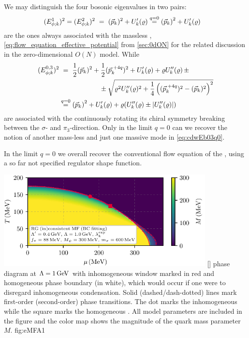 We may distinguish the four bosonic eigenvalues in two pairs:
\begin{align}
	(E_{\phi;k}^{1})^2=(E_{\phi;k}^{2})^2&\stackrel{\phantom{q=0}}{=}(\vec{p}_k)^2+U_k'(\MFrho)\stackrel{q=0}{=}\del{\vec{p}_k}^2+U_k'(\MFrho)\label{eq:cdwEb12}
\end{align}
are the ones always associated with the massless \pionModes{}, \cf{} \cref{eq:flow_equation_effective_potential} from \cref{sec:0dON} for the related discussion in the zero-dimensional $O(N)$ model. 
While
\begin{subequations}\label{eq:cdwEb03}
\begin{align}
	(E_{\phi;k}^{0,3})^2&\stackrel{\phantom{q=0}}{=}\frac{1}{2}(\vec{p}_k)^2 +\frac{1}{2}(\vec{p}_k^{\mkern 5mu+4q})^2+U_k'(\MFrho) +\MFrho U_k''(\MFrho)\, \pm \notag\\
	&\qquad\qquad\qquad\pm \sqrt{\MFrho^2 U_k''(\MFrho)^2+\frac{1}{4}\del{(\vec{p}_k^{\mkern 5mu+4q})^2-(\vec{p}_k)^2 }^2}\label{eq:cdwEb03q}\\
	&\stackrel{q=0}{=}\del{\vec{p}_k}^2+U_k'(\MFrho)+\MFrho (U_k''(\MFrho)\pm|U_k''(\MFrho)|)\label{eq:cdwEb03q0}
\end{align}
\end{subequations}
are associated with the \cdw{} continuously rotating its chiral symmetry breaking between the $\sigma$- and $\pi_3$-direction.
Only in the limit $q=0$ can we recover the notion of another mass-less and just one massive mode in \cref{eq:cdwEb03q0}.

In the limit $q=0$ we overall recover the conventional \lpa{} flow equation of the \qmm, using a so far not specified regulator shape function.\clearpage

\customWidthFigure%
	{%
	\includegraphics[width=11cm]{qmm/figures/eMFA_QMMCDW_PD_BC_04_10_88_300_600.pdf}
	}%
	[]
	{%
	\qmm{} phase diagram at $\Lambda=1\, \mathrm{GeV}$ with inhomogeneous window marked in red and homogeneous phase boundary (in white), which would occur if one were to disregard inhomogeneous condensation.
	Solid (dashed/dash-dotted) lines mark first-order (second-order) phase transitions.
	The dot marks the inhomogeneous \lp{} while the square marks the homogeneous \cp{}.
	All model parameters are included in the figure and the color map shows the magnitude of the quark mass parameter $M$.
	}%
	{fig:eMFA1}

